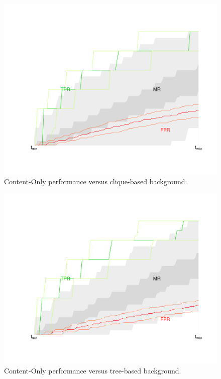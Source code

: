 \documentclass{article}
\newenvironment{rnwfig}[0]{\begin{figure}\begin{center}}{\end{center}\end{figure}}
\begin{document}
\begin{rnwfig}
\includegraphics{manuscript-content}
\caption{Content-Only performance versus clique-based background.}
\end{rnwfig}

\begin{rnwfig}
\includegraphics{manuscript-acontent}
\caption{Content-Only performance versus tree-based background.}
\end{rnwfig}
\end{document}
